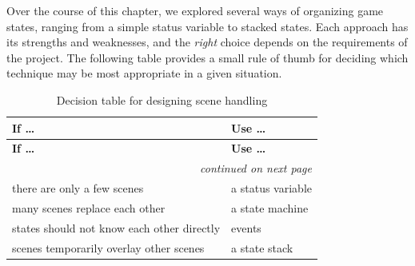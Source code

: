 Over the course of this chapter, we explored several ways of organizing game states, ranging from a simple status variable to stacked states. Each approach has its strengths and weaknesses, and the \emph{right} choice depends on the requirements of the project. The following table provides a small rule of thumb for deciding which technique may be most appropriate in a given situation.

\begin{longtable}{ll}
	\caption{Decision table for designing scene handling}\label{tabSceneHandling}\\
	\toprule
	\textbf{If \dots} & \textbf{Use \dots}\\
	\midrule
	\endfirsthead
	
	\toprule
	\textbf{If \dots} & \textbf{Use \dots}\\
	\midrule
	\endhead
	
	\midrule
	\multicolumn{2}{r}{\emph{continued on next page}} \\
	\endfoot
	
	\bottomrule
	\endlastfoot
	
	there are only a few scenes                   & a status variable \\ 
	many scenes replace each other                & a state machine \\ 
	states should not know each other directly    & events \\ 
	scenes temporarily overlay other scenes       & a state stack \\ 
\end{longtable}
